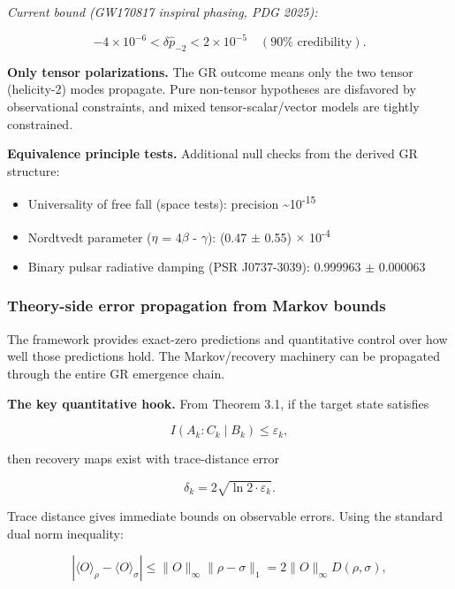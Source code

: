\emph{Current bound (GW170817 inspiral phasing, PDG 2025):}

\[
-4 \times 10^{-6} < \delta\hat{p}_{-2} < 2 \times 10^{-5}
\quad (90\% \text{ credibility}).
\]

\textbf{Only tensor polarizations.} The GR outcome means only the two tensor (helicity-2) modes propagate. Pure non-tensor hypotheses are disfavored by observational constraints, and mixed tensor-scalar/vector models are tightly constrained.

\textbf{Equivalence principle tests.} Additional null checks from the derived GR structure:

\begin{itemize}
\tightlist
\item
  Universality of free fall (space tests): precision \textasciitilde10\textsuperscript{-}\textsuperscript{1}\textsuperscript{5}
\item
  Nordtvedt parameter (\ensuremath{\eta} = 4\ensuremath{\beta} - \ensuremath{\gamma}): (0.47 \ensuremath{\pm} 0.55) \ensuremath{\times} 10\textsuperscript{-}\textsuperscript{4}
\item
  Binary pulsar radiative damping (PSR J0737-3039): 0.999963 \ensuremath{\pm} 0.000063
\end{itemize}

\subsubsection{Theory-side error propagation from Markov bounds}\label{514-theory-side-error-propagation-from-markov-bounds}

The framework provides exact-zero predictions and quantitative control over how well those predictions hold. The Markov/recovery machinery can be propagated through the entire GR emergence chain.

\textbf{The key quantitative hook.} From Theorem 3.1, if the target state satisfies

\[
I(A_k : C_k \mid B_k) \le \varepsilon_k,
\]

then recovery maps exist with trace-distance error

\[
\delta_k = 2\sqrt{\ln 2 \cdot \varepsilon_k}.
\]

Trace distance gives immediate bounds on observable errors. Using the standard dual norm inequality:

\[
|\langle O \rangle_\rho - \langle O \rangle_\sigma|
\le \|O\|_\infty \|\rho - \sigma\|_1 = 2 \|O\|_\infty D(\rho, \sigma),
\]

